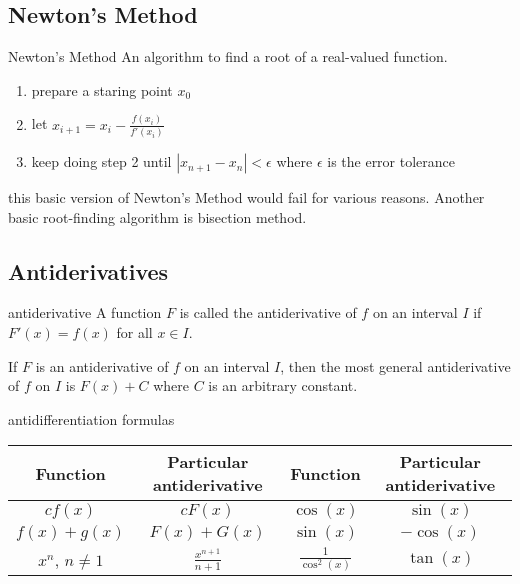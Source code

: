 \documentclass[Calculus 1 Recitation.tex]{subfiles}
\begin{document}
\subsection{Newton's Method}
\begin{myleftlinebox}
	Newton's Method
	\tcblower
	An algorithm to find a root of a real-valued function.
	\begin{enumerate}
		\item prepare a staring point $x_0$
		\item let $x_{i+1}=x_i-\frac{f(x_i)}{f'(x_i)}$
		\item keep doing step 2 until $|x_{n+1}-x_n|<\epsilon$ where $\epsilon$ is the error tolerance
	\end{enumerate}
	\begin{remark}
		this basic version of Newton's Method would fail for various reasons. Another basic root-finding algorithm is bisection method.
	\end{remark}
\end{myleftlinebox}

\subsection{Antiderivatives}
\begin{myleftlinebox}
	antiderivative
	\tcblower
	A function $F$ is called the antiderivative of $f$ on an interval $I$ if $F'(x)=f(x)$ for all $x\in I$.
	\begin{theorem}
		If $F$ is an antiderivative of $f$ on an interval $I$, then the most general antiderivative of $f$ on $I$ is $F(x)+C$ where $C$ is an arbitrary constant.
	\end{theorem}
\end{myleftlinebox}

\begin{myleftlinebox}
	antidifferentiation formulas
	\tcblower
	\begin{center}
		\begin{tabular}{cc|cc}
			\hline
			Function & Particular antiderivative & Function & Particular antiderivative\\\hline
			$cf(x)$ & $cF(x)$ & $\cos(x)$ & $\sin(x)$\\
			$f(x)+g(x)$ & $F(x)+G(x)$ & $\sin(x)$ & $-\cos(x)$\\
			$x^n$, $n\neq 1$ & $\frac{x^{n+1}}{n+1}$ & $\frac{1}{\cos^2(x)}$ & $\tan(x)$\\
			\hline
		\end{tabular}
	\end{center}
\end{myleftlinebox}
\end{document}
